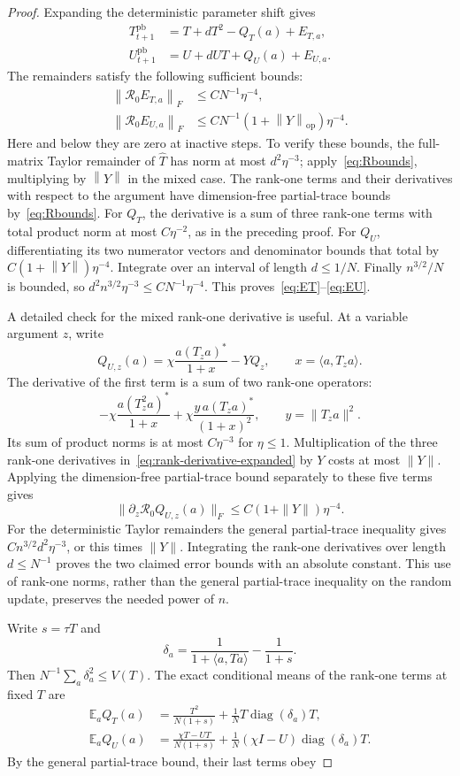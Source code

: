 \documentclass[11pt]{article}
\theoremstyle{definition}\newtheorem{definition}[theorem]{Definition}
\theoremstyle{remark}\newtheorem{remark}[theorem]{Remark}
\newcommand{\E}{\mathbb E}
\newcommand{\R}{\mathcal R}
\newcommand{\op}{\mathrm{op}}
\newcommand{\ip}[2]{\langle#1,#2\rangle}
\newcommand{\norm}[1]{\left\lVert#1\right\rVert}
\begin{document}
\begin{proof}
Expanding the deterministic parameter shift gives
\begin{align}
 T_{t+1}^{\mathrm{pb}}&=T+dT^2-Q_T(a)+E_{T,a},\label{eq:Texp}\\
 U_{t+1}^{\mathrm{pb}}&=U+dUT+Q_U(a)+E_{U,a}.\label{eq:Uexp}
\end{align}
The remainders satisfy the following sufficient bounds:
\begin{align}
 \norm{\R_0E_{T,a}}_F&\le C N^{-1}\eta^{-4},\label{eq:ET}\\
 \norm{\R_0E_{U,a}}_F&\le C N^{-1}(1+\norm Y_{\op})\eta^{-4}.
 \label{eq:EU}
\end{align}
Here and below they are zero at inactive steps. To verify these bounds, the full-matrix Taylor remainder of $\widehat T$ has norm at most $d^2\eta^{-3}$; apply~\eqref{eq:Rbounds}, multiplying by $\norm Y$ in the mixed case. The rank-one terms and their derivatives with respect to the argument have dimension-free partial-trace bounds by~\eqref{eq:Rbounds}. For $Q_T$, the derivative is a sum of three rank-one terms with total product norm at most $C\eta^{-2}$, as in the preceding proof. For $Q_U$, differentiating its two numerator vectors and denominator bounds that total by $C(1+\norm Y)\eta^{-4}$. Integrate over an interval of length $d\le1/N$. Finally $n^{3/2}/N$ is bounded, so $d^2 n^{3/2}\eta^{-3}\le C N^{-1}\eta^{-4}$. This proves~\eqref{eq:ET}--\eqref{eq:EU}.

A detailed check for the mixed rank-one derivative is useful. At a variable argument $z$, write
\[
 Q_{U,z}(a)=\chi\frac{a(T_za)^*}{1+x}-YQ_z,
 \qquad x=\langle a,T_za\rangle.
\]
The derivative of the first term is a sum of two rank-one operators:
\[
 -\chi\frac{a(T_z^2a)^*}{1+x}
 +\chi\frac{y\,a(T_za)^*}{(1+x)^2},\qquad y=\|T_za\|^2.
\]
Its sum of product norms is at most $C\eta^{-3}$ for $\eta\le1$. Multiplication of the three rank-one derivatives in~\eqref{eq:rank-derivative-expanded} by $Y$ costs at most $\|Y\|$. Applying the dimension-free partial-trace bound separately to these five terms gives
\[
 \|\partial_z\R_0Q_{U,z}(a)\|_F
 \le C(1+\|Y\|)\eta^{-4}.
\]
For the deterministic Taylor remainders the general partial-trace inequality gives
$Cn^{3/2}d^2\eta^{-3}$, or this times $\|Y\|$. Integrating the rank-one derivatives over length $d\le N^{-1}$ proves the two claimed error bounds with an absolute constant. This use of rank-one norms, rather than the general partial-trace inequality on the random update, preserves the needed power of $n$.


Write $s=\tau T$ and
\[
 \delta_a=\frac1{1+\ip a{Ta}}-\frac1{1+s}.
\]
Then $N^{-1}\sum_a\delta_a^2\le V(T)$. The exact conditional means of the rank-one terms at fixed $T$ are
\begin{align}
 \E_aQ_T(a)&=\frac{T^2}{N(1+s)}+
                \frac1N T\operatorname{diag}(\delta_a)T,
                \label{eq:Tmean}\\
 \E_aQ_U(a)&=\frac{\chi T-UT}{N(1+s)}+
                \frac1N(\chi I-U)\operatorname{diag}(\delta_a)T.
                \label{eq:Umean}
\end{align}
By the general partial-trace bound, their last terms obey


\end{proof}
\end{document}
